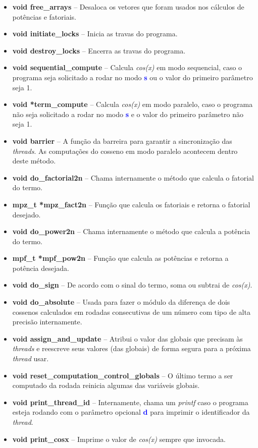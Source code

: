 \documentclass[11pt]{article}
\begin{document}
\begin{itemize}
	\item \textbf{\textcolor{sblue}{void} free\_arrays} -- Desaloca os vetores que foram usados nos cálculos de potências e fatoriais.
	\item \textbf{\textcolor{sblue}{void} initiate\_locks} -- Inicia as travas do programa.
	\item \textbf{\textcolor{sblue}{void} destroy\_locks} -- Encerra as travas do programa.
	\item \textbf{\textcolor{sblue}{void} sequential\_compute} -- Calcula \textit{cos(x)} em modo sequencial, caso o programa seja solicitado a rodar no modo \textbf{\textcolor{blue}{s}} ou o valor do primeiro parâmetro seja 1.
	\item \textbf{\textcolor{sblue}{void} *term\_compute} -- Calcula \textit{cos(x)} em modo paralelo, caso o programa não seja solicitado a rodar no modo \textbf{\textcolor{blue}{s}} e o valor do primeiro parâmetro não seja 1.
	\item \textbf{\textcolor{sblue}{void} barrier} -- A função da barreira para garantir a sincronização das \textit{threads}. As computações do cosseno em modo paralelo acontecem dentro deste método.
	\item \textbf{\textcolor{sblue}{void} do\_factorial2n} -- Chama internamente o método que calcula o fatorial do termo.
	\item \textbf{\textcolor{sblue}{mpz\_t} *mpz\_fact2n} -- Função que calcula os fatoriais e retorna o fatorial desejado.
	\item \textbf{\textcolor{sblue}{void} do\_power2n} -- Chama internamente o método que calcula a potência do termo.
	\item \textbf{\textcolor{sblue}{mpf\_t} *mpf\_pow2n} -- Função que calcula as potências e retorna a potência desejada.
	\item \textbf{\textcolor{sblue}{void} do\_sign} -- De acordo com o sinal do termo, soma ou subtrai de \textit{cos(x)}.
	\item \textbf{\textcolor{sblue}{void} do\_absolute} -- Usada para fazer o módulo da diferença de dois cossenos calculados em rodadas consecutivas de um número com tipo de alta precisão internamente.
	\item \textbf{\textcolor{sblue}{void} assign\_and\_update} -- Atribui o valor das globais que precisam às \textit{threads} e reescreve seus valores (das globais) de forma segura para a próxima \textit{thread} usar.
	\item \textbf{\textcolor{sblue}{void} reset\_computation\_control\_globals} -- O último termo a ser computado da rodada reinicia algumas das variáveis globais.
	\item \textbf{\textcolor{sblue}{void} print\_thread\_id} -- Internamente, chama um \textit{printf} caso o programa esteja rodando com o parâmetro opcional \textbf{\textcolor{blue}{d}} para imprimir o identificador da \textit{thread}.
	\item \textbf{\textcolor{sblue}{void} print\_cosx} -- Imprime o valor de \textit{cos(x)} sempre que invocada. 
\end{itemize}
\end{document}
